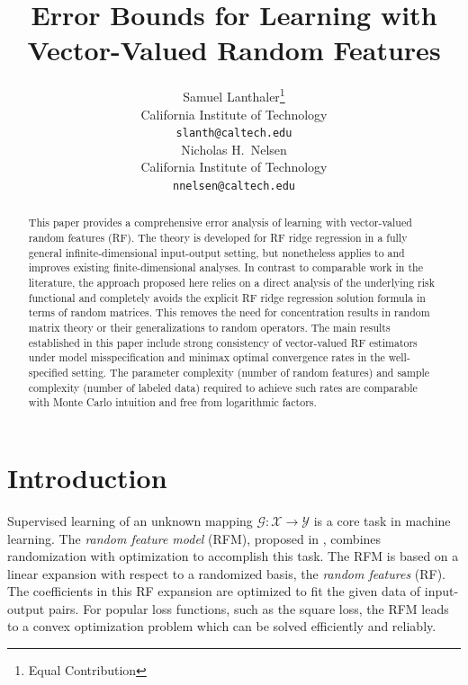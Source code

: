 \documentclass{article}
\title{Error Bounds for Learning with\\
Vector-Valued Random Features}
\author{%
  Samuel Lanthaler\thanks{Equal Contribution} \\
  California Institute of Technology\\
  \texttt{slanth@caltech.edu}\\
  \And
  Nicholas H.~Nelsen\footnotemark[1] \\
  California Institute of Technology \\
  \texttt{nnelsen@caltech.edu} \\
}
\theoremstyle{plain}
\theoremstyle{my_def}
\theoremstyle{my_rem}
\numberwithin{equation}{section}
\numberwithin{theorem}{section}%
\newcommand{\cG}{\mathcal{G}}
\newcommand{\cX}{\mathcal{X}}
\newcommand{\cY}{\mathcal{Y}}
\begin{document}
\maketitle


\begin{abstract}
This paper provides a comprehensive error analysis of learning with vector-valued random features (RF). The theory is developed for RF ridge regression in a fully general infinite-dimensional input-output setting, but nonetheless applies to and improves existing finite-dimensional analyses. In contrast to comparable work in the literature, the approach proposed here relies on a direct analysis of the underlying risk functional and completely avoids the explicit RF ridge regression solution formula in terms of random matrices. This removes the need for concentration results in random matrix theory or their generalizations to random operators. The main results established in this paper include strong consistency of vector-valued RF estimators under model misspecification and minimax optimal convergence rates in the well-specified setting. The parameter complexity (number of random features) and sample complexity (number of labeled data) required to achieve such rates are comparable with Monte Carlo intuition and free from logarithmic factors.
\end{abstract}


\section{Introduction}
Supervised learning of an unknown mapping $\cG\colon \cX \to \cY$ is a core task in machine learning. The \emph{random feature model} (RFM), proposed in \cite{rahimi2007random,RR2008}, combines randomization with optimization to accomplish this task. The RFM is based on a linear expansion with respect to a randomized basis, the \emph{random features} (RF). The coefficients in this RF expansion are optimized to fit the given data of input-output pairs. For popular loss functions, such as the square loss, the RFM leads to a convex optimization problem which can be solved efficiently and reliably.
\end{document}
